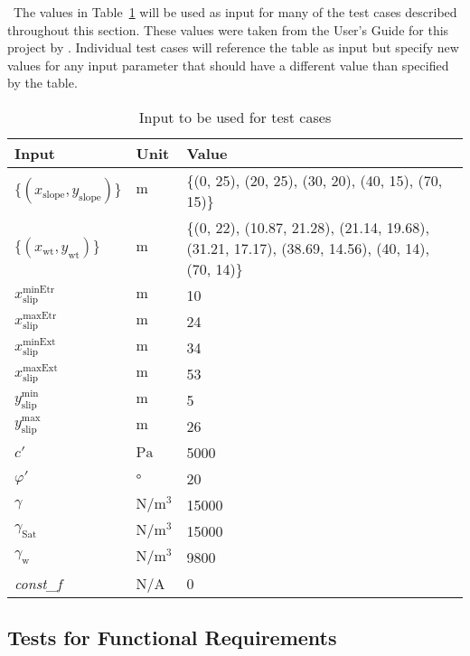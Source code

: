 \documentclass[12pt, titlepage]{article}
\begin{document}
~\newline \noindent The values in Table~\ref{Inputs} will be used as input for 
many of the test cases described throughout this section. These values were 
taken from the User's Guide for this project by \cite{UserGuide}. Individual 
test cases will reference the table as input but specify new values for any 
input parameter that should have a different value than specified by the table.

\begin{table}[!h]
	\renewcommand{\arraystretch}{1.5}
	\begin{tabularx}{1.0\textwidth}{p{3cm} l X}
		\toprule \textbf{Input} &
		\textbf{Unit} & \textbf{Value}\\ \midrule
		$\{\left(x_\text{slope},y_\text{slope}\right)\}$ & $\text{m}$ & \{(0, 
		25), 
		(20, 25), (30, 20), (40, 15), (70, 15)\}\\
		$\{\left(x_\text{wt},y_\text{wt}\right)\}$ & $\text{m}$ & \{(0, 22), 
		(10.87, 21.28), (21.14, 19.68), (31.21, 17.17), (38.69, 14.56), (40, 
		14), (70, 14)\}\\
		${x_\text{slip}^\text{minEtr}}$ & $\text{m}$ & 10\\
		${x_\text{slip}^\text{maxEtr}}$ & $\text{m}$ & 24\\
		${x_\text{slip}^\text{minExt}}$ & $\text{m}$ & 34\\
		${x_\text{slip}^\text{maxExt}}$ & $\text{m}$ & 53\\
		${y_\text{slip}^\text{min}}$ & $\text{m}$ & 5\\
		${y_\text{slip}^\text{max}}$ & $\text{m}$ & 26\\
		$c'$ & $\si{\pascal}$ & 5000 \\
		$\varphi'$ & \si{\degree} & 20\\
		$\gamma$ & $\si{\newton\per\meter\cubed}$ & 15000 \\
		$\gamma_{\text{Sat}}$ & $\si{\newton\per\meter\cubed}$ & 15000 \\
		$\gamma_{\text{w}}$ & $\si{\newton\per\meter\cubed}$ & 9800 \\
		\textit{const\_f} & N/A & 0\\ 
		\bottomrule
	\end{tabularx}
	\caption{Input to be used for test cases}
	\label{Inputs}
\end{table}

\subsection{Tests for Functional Requirements}
\end{document}
